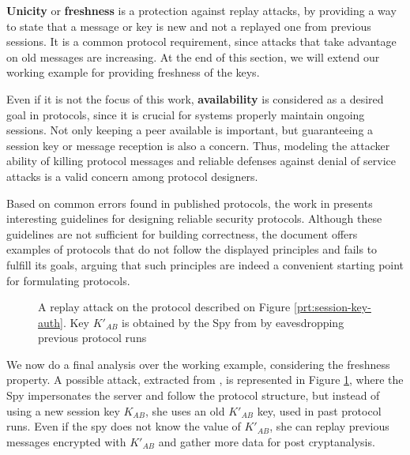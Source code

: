\textbf{Unicity} or \textbf{freshness} is a protection against replay attacks, by providing a way to state that a message or key is new and not a replayed one from previous sessions. It is a common protocol requirement, since attacks that take advantage on old messages are increasing. At the end of this section, we will extend our working example for providing freshness of the keys.

Even if it is not the focus of this work, \textbf{availability} is considered as a desired goal in protocols, since it is crucial for systems properly maintain ongoing sessions. Not only keeping a peer available is important, but guaranteeing a session key or message reception is also a concern. Thus, modeling the attacker ability of killing protocol messages and reliable defenses against denial of service attacks is a valid concern among protocol designers.

Based on common errors found in published protocols, the work in \cite{AbadiNeedham96} presents interesting guidelines for designing reliable security protocols. Although these guidelines are not sufficient for building correctness, the document offers examples of protocols that do not follow the displayed principles and fails to fulfill its goals, arguing that such principles are indeed a convenient starting point for formulating protocols.

\begin{figure}[!ht]
  \centering

  \caption{A replay attack on the protocol described on Figure \ref{prt:session-key-auth}. Key $K'_{AB}$ is obtained by the Spy from by eavesdropping previous protocol runs}
  \label{fig:attack-ex-replay}
\end{figure}

We now do a final analysis over the working example, considering the freshness property. A possible attack, extracted from \cite{BoydMathuria2008}, is represented in Figure \ref{fig:attack-ex-replay}, where the Spy impersonates the server and follow the protocol structure, but instead of using a new session key $K_{AB}$, she uses an old $K'_{AB}$ key, used in past protocol runs. Even if the spy does not know the value of $K'_{AB}$, she can replay previous messages encrypted with $K'_{AB}$ and gather more data for post cryptanalysis.

